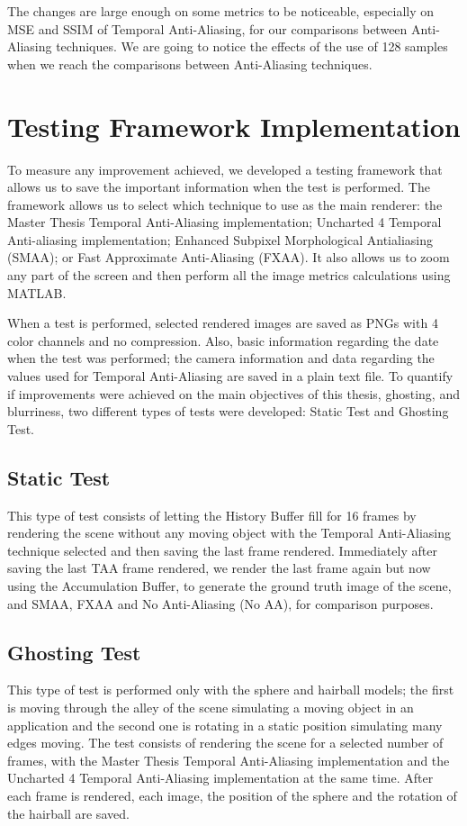 \documentclass{cslthse-msc}
\begin{document}
The changes are large enough on some metrics to be noticeable, especially on MSE and SSIM of Temporal Anti-Aliasing, for our comparisons between Anti-Aliasing techniques. We are going to notice the effects of the use of 128 samples when we reach the comparisons between Anti-Aliasing techniques.

\section{Testing Framework Implementation}
To measure any improvement achieved, we developed a testing framework that allows us to save the important information when the test is performed. The framework allows us to select which technique to use as the main renderer: the Master Thesis Temporal Anti-Aliasing implementation; Uncharted 4 Temporal Anti-aliasing implementation; Enhanced Subpixel Morphological Antialiasing (SMAA); or Fast Approximate Anti-Aliasing (FXAA). It also allows us to zoom any part of the screen and then perform all the image metrics calculations using MATLAB.

When a test is performed, selected rendered images are saved as PNGs with 4 color channels and no compression. Also, basic information regarding the date when the test was performed; the camera information and data regarding the values used for Temporal Anti-Aliasing are saved in a plain text file.
To quantify if improvements were achieved on the main objectives of this thesis, ghosting, and blurriness, two different types of tests were developed: Static Test and Ghosting Test.

\subsection{Static Test}
This type of test consists of letting the History Buffer fill for 16 frames by rendering the scene without any moving object with the Temporal Anti-Aliasing technique selected and then saving the last frame rendered. Immediately after saving the last TAA frame rendered, we render the last frame again but now using the Accumulation Buffer, to generate the ground truth image of the scene, and SMAA, FXAA and No Anti-Aliasing (No AA), for comparison purposes. 

\subsection{Ghosting Test}
This type of test is performed only with the sphere and hairball models; the first is moving through the alley of the scene simulating a moving object in an application and the second one is rotating in a static position simulating many edges moving. The test consists of rendering the scene for a selected number of frames, with the Master Thesis Temporal Anti-Aliasing implementation and the Uncharted 4 Temporal Anti-Aliasing implementation at the same time. After each frame is rendered, each image, the position of the sphere and the rotation of the hairball are saved.
\end{document}
